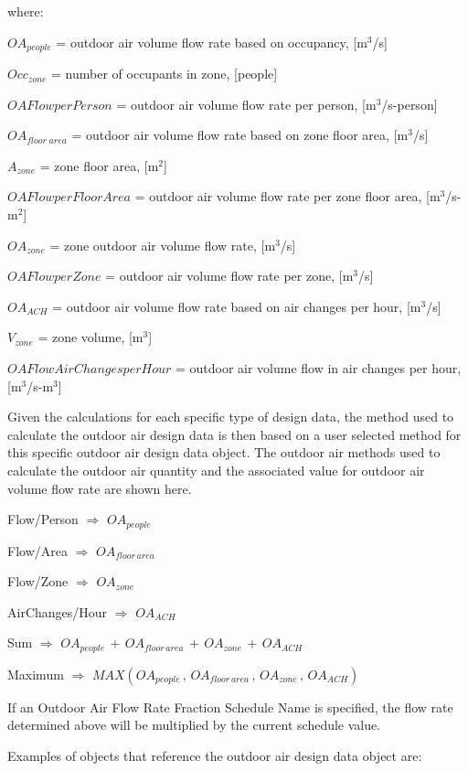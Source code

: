 where:

\(O{A_{people}}\) = outdoor air volume flow rate based on occupancy, {[}m\(^{3}\)/s{]}

\(Oc{c_{zone}}\) = number of occupants in zone, {[}people{]}

\(OAFlowperPerson\) = outdoor air volume flow rate per person, {[}m\(^{3}\)/s-person{]}

\(O{A_{floor\;area}}\) = outdoor air volume flow rate based on zone floor area, {[}m\(^{3}\)/s{]}

\({A_{zone}}\) = zone floor area, {[}m\(^{2}\){]}

\(OAFlowperFloorArea\) = outdoor air volume flow rate per zone floor area, {[}m\(^{3}\)/s-m\(^{2}\){]}

\(O{A_{zone}}\) = zone outdoor air volume flow rate, {[}m\(^{3}\)/s{]}

\(OAFlowperZone\) = outdoor air volume flow rate per zone, {[}m\(^{3}\)/s{]}

\(O{A_{ACH}}\) = outdoor air volume flow rate based on air changes per hour, {[}m\(^{3}\)/s{]}

\({V_{zone}}\) = zone volume, {[}m\(^{3}\){]}

\(OAFlowAirChangesperHour\) = outdoor air volume flow in air changes per hour, {[}m\(^{3}\)/s-m\(^{3}\){]}

Given the calculations for each specific type of design data, the method used to calculate the outdoor air design data is then based on a user selected method for this specific outdoor air design data object. The outdoor air methods used to calculate the outdoor air quantity and the associated value for outdoor air volume flow rate are shown here.

Flow/Person $\Rightarrow$ \(O{A_{people}}\)

Flow/Area $\Rightarrow$ \(O{A_{floor\,area}}\)

Flow/Zone $\Rightarrow$ \(O{A_{zone}}\)

AirChanges/Hour $\Rightarrow$ \(O{A_{ACH}}\)

Sum $\Rightarrow$ \(O{A_{people}}\, + \,O{A_{floor\,area}}\, + \,O{A_{zone}}\, + \,O{A_{ACH}}\)

Maximum $\Rightarrow$ \(MAX\left( {O{A_{people}}\,,\,O{A_{floor\,area}}\,,\,O{A_{zone}}\,,\,O{A_{ACH}}} \right)\)

If an Outdoor Air Flow Rate Fraction Schedule Name is specified, the flow rate determined above will be multiplied by the current schedule value.

Examples of objects that reference the outdoor air design data object are:

